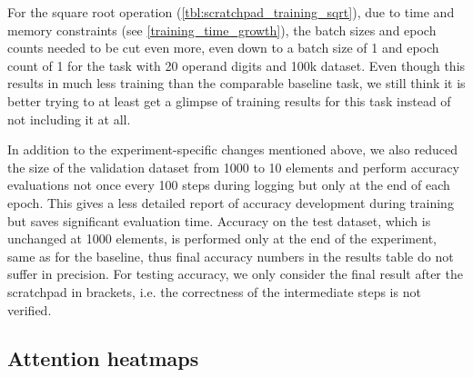 For the square root operation (\cref{tbl:scratchpad_training_sqrt}), due to time and memory constraints (see \cref{training_time_growth}), the batch sizes and epoch counts needed to be cut even more, even down to a batch size of 1 and epoch count of 1 for the task with 20 operand digits and 100k dataset. Even though this results in much less training than the comparable baseline task, we still think it is better trying to at least get a glimpse of training results for this task instead of not including it at all.


In addition to the experiment-specific changes mentioned above, we also reduced the size of the validation dataset from 1000 to 10 elements and perform accuracy evaluations not once every 100 steps during logging but only at the end of each epoch. This gives a less detailed report of accuracy development during training but saves significant evaluation time. Accuracy on the test dataset, which is unchanged at 1000 elements, is performed only at the end of the experiment, same as for the baseline, thus final accuracy numbers in the results table do not suffer in precision.
For testing accuracy, we only consider the final result after the scratchpad in brackets, i.e. the correctness of the intermediate steps is not verified.

\subsection{Attention heatmaps}